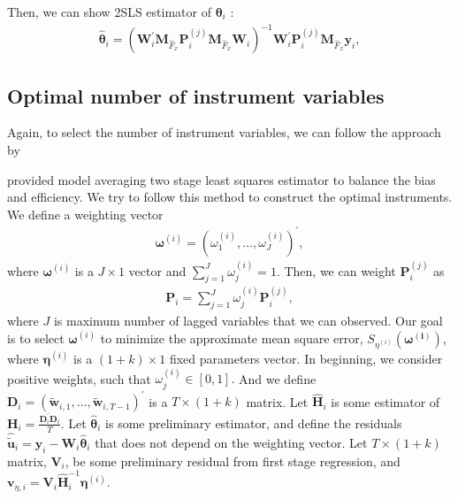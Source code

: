 \documentclass[12pt,a4paper,hyperref]{article}
\begin{document}
Then, we can show 2SLS estimator of $\boldsymbol{\theta}_{i}$ :
\begin{align}
\hat{\boldsymbol{\theta}}_{i}= \left( \boldsymbol{W}^{'}_{i}\boldsymbol{M}_{\hat{F}_{x}}\boldsymbol{P}^{(j)}_{i}\boldsymbol{M}_{\hat{F}_{x}} \boldsymbol{W}_{i} \right)^{-1} \boldsymbol{W}^{'}_{i}\boldsymbol{P}^{(j)}_{i}\boldsymbol{M}_{\hat{F}_{x}} \boldsymbol{y}_{i},
\end{align}


\subsection{Optimal number of instrument variables}
Again, to select the number of instrument variables, we can follow the approach by \citet{Kuersteiner:2010}


\citet{Kuersteiner:2010} provided model averaging two stage least squares estimator to balance the bias and efficiency. We try to follow this method to construct the optimal instruments. We define a weighting vector
\begin{align}
\boldsymbol{\omega}^{(i)}=\left(\omega^{(i)}_{1}, \ldots,\omega^{(i)}_{J}  \right)^{'},
\end{align}
where $\boldsymbol{\omega}^{(i)}$ is a $J \times 1$ vector and $\sum^{J}_{j=1} \omega^{(i)}_{j}=1.$
Then, we can weight $\boldsymbol{P}^{(j)}_{i}$ as
\begin{align}
\boldsymbol{P}_{i}= \sum^{J}_{j=1} \omega^{(i)}_{j} \boldsymbol{P}^{(j)}_{i},
\end{align}
where $J$ is maximum number of lagged variables that we can observed.
Our goal is to select $\boldsymbol{\omega}^{(i)}$ to minimize the approximate mean square error, $S_{\eta^{(i)}}\left(\boldsymbol{\omega^{(i)}} \right)$, where $\boldsymbol{\eta}^{(i)}$ is a $(1+k) \times 1$ fixed parameters vector.
 In beginning, we consider positive weights, such that $\omega^{(i)}_{j} \in [0,1].$ And we define $\boldsymbol{D}_{i}=\left( \tilde{\boldsymbol{w}}_{i,1},\ldots,  \tilde{\boldsymbol{w}}_{i,T-1} \right)^{'}$ is a $T \times (1+k)$ matrix. Let $\hat{\boldsymbol{H}}_{i}$ is some estimator of $\boldsymbol{H}_{i}=\frac{\boldsymbol{D}^{'}_{i}\boldsymbol{D}_{i}}{T}$. Let $\hat{\boldsymbol{\theta}}_{i}$ is some preliminary estimator, and define the residuals $\hat{\tilde{\boldsymbol{u}}}_{i}=\boldsymbol{y}_{i}-\boldsymbol{W}_{i}\hat{\boldsymbol{\theta}}_{i}$ that does not depend on the weighting vector.  Let $T \times (1+k)$ matrix, $\boldsymbol{V}_{i}$, be some preliminary residual from first stage regression, and $\boldsymbol{v}_{\eta, i}=\boldsymbol{V}_{i} \hat{\boldsymbol{H}}_{i}^{-1}\boldsymbol{\eta}^{(i)}$.
\end{document}
